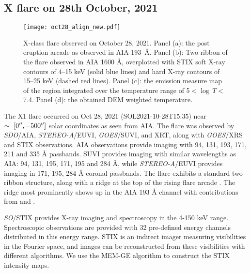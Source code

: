 \subsection{X flare on 28th October, 2021}\label{sec:x1-obs}
\begin{figure}[ht!]
    \centering
    \texttt{[image: oct28\_align\_new.pdf]}
    \caption{X-class flare observed on October 28, 2021. Panel (a): the post eruption arcade as observed in AIA 193~{\AA}. Panel (b): Two ribbon of the flare observed in AIA 1600 {\AA}, overplotted with STIX soft X-ray contours of 4{--}15 keV (solid blue lines) and hard X-ray contours of 15{--}25 keV (dashed red lines). Panel (c): the emission measure map of the region integrated over the temperature range of 5$<\log\,T<$7.4. Panel (d): the obtained DEM weighted temperature.}
    \label{fig:flare}
\end{figure}
The X1 flare occurred on Oct 28, 2021 (SOL2021-10-28T15:35) near $\sim~[0\hbox{$^{\prime\prime}$},-500\hbox{$^{\prime\prime}$}]$ solar coordinates as seen from AIA. The flare was observed by {\it SDO}/AIA, {\it STEREO-A}/EUVI, {\it GOES}/SUVI, and XRT, along with {\it GOES}/XRS and STIX observations. AIA observations provide imaging with 94, 131, 193, 171, 211 and 335 {\AA} passbands. SUVI provides imaging with similar wavelengths as AIA: 94, 131, 195, 171, 195 and 284 {\AA}, while {\it STEREO-A}/EUVI provides imaging in 171, 195, 284 {\AA} coronal passbands. The flare exhibits a standard two-ribbon structure, along with a ridge at the top of the rising flare arcade \citep{longcope22}. The ridge most prominently shows up in the AIA 193 {\AA} channel with contributions from  and . %

{\it SO}/STIX provides X-ray imaging and spectroscopy in the 4-150 keV range. Spectroscopic observations are provided with 32 pre-defined energy channels distributed in this energy range. STIX is an indirect imager measuring visibilities in the Fourier space, and images can be reconstructed from these visibilities with different algorithms. We use the MEM-GE algorithm \citep{massa20} to construct the STIX intensity maps.

